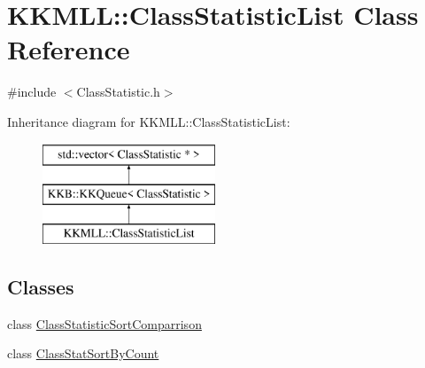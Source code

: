 \hypertarget{class_k_k_m_l_l_1_1_class_statistic_list}{}\section{K\+K\+M\+LL\+:\+:Class\+Statistic\+List Class Reference}
\label{class_k_k_m_l_l_1_1_class_statistic_list}


{\ttfamily \#include $<$Class\+Statistic.\+h$>$}

Inheritance diagram for K\+K\+M\+LL\+:\+:Class\+Statistic\+List\+:\begin{figure}[H]
\begin{center}
\leavevmode
\includegraphics[height=3.000000cm]{class_k_k_m_l_l_1_1_class_statistic_list}
\end{center}
\end{figure}
\subsection*{Classes}
\begin{DoxyCompactItemize}
\item 
class \hyperlink{class_class_statistic_list_1_1_class_statistic_sort_comparrison}{Class\+Statistic\+Sort\+Comparrison}
\item 
class \hyperlink{class_class_statistic_list_1_1_class_stat_sort_by_count}{Class\+Stat\+Sort\+By\+Count}
\end{DoxyCompactItemize}
